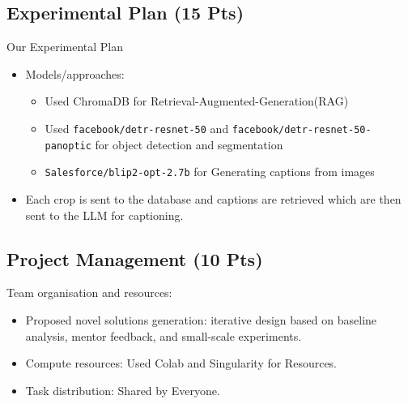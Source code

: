 \documentclass[11pt]{article}
\begin{document}
\subsection{Experimental Plan (15 Pts)}
Our Experimental Plan
\begin{itemize}
  \item Models/approaches:
        \begin{itemize}
          \item Used ChromaDB for Retrieval-Augmented-Generation(RAG)
          \item Used \texttt{facebook/detr-resnet-50} and \texttt{facebook/detr-resnet-50-panoptic} for object detection and segmentation
          \item \texttt{Salesforce/blip2-opt-2.7b} for Generating captions from images
        \end{itemize}
  \item Each crop is sent to the database and captions are retrieved which are then sent to the LLM for captioning.
\end{itemize}

\subsection{Project Management (10 Pts)}
Team organisation and resources:
\begin{itemize}
  \item Proposed novel solutions generation: iterative design based on baseline analysis, mentor feedback, and small-scale experiments.
  \item Compute resources: Used Colab and Singularity for Resources.
  \item Task distribution: Shared by Everyone.
\end{itemize}
\end{document}
